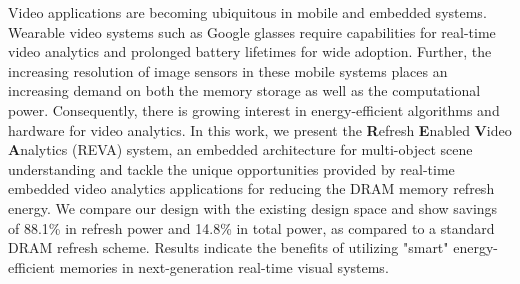 Video applications are becoming ubiquitous in mobile and embedded systems. Wearable video systems such as Google glasses require capabilities for real-time video analytics and prolonged battery lifetimes for wide adoption. Further, the increasing resolution of image sensors in these mobile systems places an increasing demand on both the memory storage as well as the computational power. Consequently, there is growing interest in energy-efficient algorithms and hardware for video analytics. In this work, we present the \textbf{R}efresh \textbf{E}nabled \textbf{V}ideo \textbf{A}nalytics (REVA) system, an embedded architecture for multi-object scene understanding and tackle the unique opportunities provided by real-time embedded video analytics applications for reducing the DRAM memory refresh energy. We compare our design with the existing design space and show savings of 88.1\% in refresh power and 14.8\% in total power, as compared to a standard DRAM refresh scheme. Results indicate the benefits of utilizing "smart" energy-efficient memories in next-generation real-time visual systems. 

